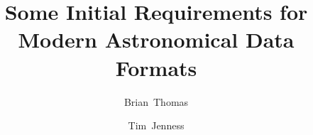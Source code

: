 \documentclass[final,authoryear,5p,times,twocolumn]{elsarticle}
\begin{document}
\begin{frontmatter}



\title{Some Initial Requirements for Modern Astronomical Data Formats}


\author[noao]{Brian~Thomas}
\author[cornell]{Tim~Jenness}



\end{frontmatter}
\end{document}
